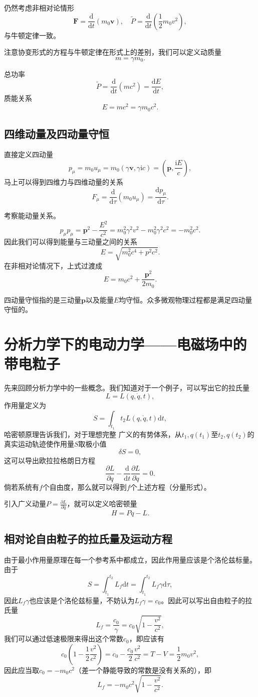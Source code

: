 \documentclass[UTF8]{ctexbook}
\renewcommand{\d}{\mathrm{d}}
\renewcommand{\b}{\boldsymbol}
\renewcommand{\i}{\mathrm{i}}
\numberwithin{equation}{chapter}
\begin{document}
	仍然考虑非相对论情形
	\[\b{F}=\frac{\d }{\d t}(m_0\b{v}),\quad \tilde{P}=\frac{\d }{\d t}\left(\frac{1}{2}m_0 v^2\right),\]
	与牛顿定律一致。
	
	注意协变形式的方程与牛顿定律在形式上的差别，我们可以定义动质量
	\[m=\gamma m_0.\]
	
	总功率
	\[\tilde{P}=\frac{\d}{\d t}(mc^2)=\frac{\d E}{\d t},\]
	质能关系
	\[E=mc^2=\gamma m_0c^2.\]
	
	\subsection{四维动量及四动量守恒}
	
	直接定义四动量
	\[p_\mu=m_0 u_\mu=m_0(\gamma\b{v},\gamma\i c)=\left(\b{p},\frac{\i E}{c}\right),\]
	马上可以得到四维力与四维动量的关系
	\[F_\mu=\frac{\d }{\d \tau}(m_0u_\mu)=\frac{\d p_\mu}{\d \tau}.\]
	
	考察能动量关系。
	\[p_\mu p_\mu =\b{p}^2-\frac{E^2}{c^2}=m_0^2\gamma^2v^2-m_0^2\gamma^2c^2=-m_0^2 c^2.\]
	因此我们可以得到能量与三动量之间的关系
	\[E=\sqrt{m_0^2 c^4+p^2c^2}.\]
	在非相对论情况下，上式过渡成
	\[E=m_0c^2+\frac{\b{p}^2}{2m_0}.\]
	
	四动量守恒指的是三动量$\b{p}$以及能量$E$均守恒。众多微观物理过程都是满足四动量守恒的。
	
	\section{分析力学下的电动力学——电磁场中的带电粒子}
	先来回顾分析力学中的一些概念。我们知道对于一个例子，可以写出它的拉氏量
	\[L=L(q,\dot{q},t),\]
	作用量定义为
	\[S=\int_{t_1}{t_2} L(q,\dot{q},t)\d t,\]
	哈密顿原理告诉我们，对于理想完整 广义的有势体系，从$t_1,q(t_1)$至$t_2,q(t_2)$的真实运动轨迹使作用量$S$取极小值
	\[\delta S=0,\]
	这可以导出欧拉拉格朗日方程
	\[\frac{\partial L}{\partial q}-\frac{\d }{\d t}\frac{\partial L}{\partial \dot{q}}=0.\]
	倘若系统有$f$个自由度，那么就可以得到$f$个上述方程（分量形式）。
	
	引入广义动量$P=\frac{\partial L}{\partial \dot{q}}$，就可以定义哈密顿量
	\[H=P\dot{q}-L.\]
	 
	\subsection{相对论自由粒子的拉氏量及运动方程}
	由于最小作用量原理在每一个参考系中都成立，因此作用量应该是个洛伦兹标量。由于
	\[S=\int_{t_1}^{t_2}L_f \d t=\int_{t_1}^{t_2}L_f\gamma\d \tau,\]
	因此$L_f \gamma$也应该是个洛伦兹标量，不妨认为$L_f \gamma = c_0$。因此可以写出自由粒子的拉氏量
	\[L_f=\frac{c_0}{\gamma}=c_0\sqrt{1-\frac{v^2}{c^2}},\]
	我们可以通过低速极限来得出这个常数$c_0$，即应该有
	\[c_0\left(1-\frac{1}{2} \frac{v^2}{c^2}\right)=c_0 -\frac{c_0}{2}\frac{v^2}{c^2}=T-V=\frac{1}{2}m_0 v^2,\]
	因此应当取$c_0=-m_0c^2$（差一个静能导致的常数是没有关系的），即
	\[L_f=-m_0 c^2\sqrt{1-\frac{v^2}{c^2}}.\]
	
\end{document}
